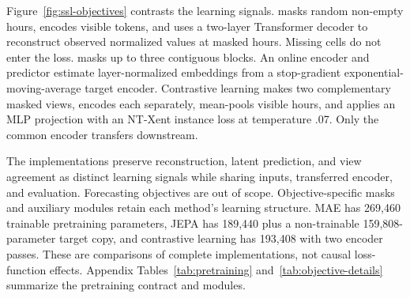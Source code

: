 Figure~\ref{fig:ssl-objectives} contrasts the learning signals. \MAE{} masks random non-empty hours, encodes visible tokens, and uses a two-layer Transformer decoder to reconstruct observed normalized values at masked hours. Missing cells do not enter the loss. \JEPA{} masks up to three contiguous blocks. An online encoder and predictor estimate layer-normalized embeddings from a stop-gradient exponential-moving-average target encoder. Contrastive learning makes two complementary masked views, encodes each separately, mean-pools visible hours, and applies an MLP projection with an NT-Xent instance loss at temperature .07. Only the common encoder transfers downstream.

The implementations preserve reconstruction, latent prediction, and view agreement as distinct learning signals while sharing inputs, transferred encoder, and evaluation. Forecasting objectives are out of scope. Objective-specific masks and auxiliary modules retain each method's learning structure. MAE has 269,460 trainable pretraining parameters, JEPA has 189,440 plus a non-trainable 159,808-parameter target copy, and contrastive learning has 193,408 with two encoder passes. These are comparisons of complete implementations, not causal loss-function effects. Appendix Tables~\ref{tab:pretraining} and~\ref{tab:objective-details} summarize the pretraining contract and modules.
